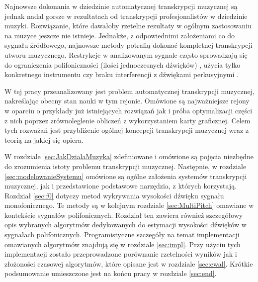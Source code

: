 \documentclass[12pt,a4paper,twoside]{mwart}
\begin{document}
Najnowsze dokonania w dziedzinie automatycznej transkrypcji muzycznej są jednak nadal gorsze w rezultatach od transkrypcji profesjonalistów w dziedzinie muzyki. Rozwiązanie, które dawałoby rzetelne rezultaty w ogólnym zastosowaniu na muzyce jeszcze nie istnieje. Jednakże, z odpowiednimi założeniami co do sygnału źródłowego, najnowsze metody potrafią dokonać kompletnej transkrypcji utworu muzycznego. Restrykcje w analizowanym sygnale często sprowadzają się do ograniczenia polifoniczności (ilości jednoczesnych dźwięków) \cite{Transcription:BayesianHarmonicModels}, użycia tylko konkretnego instrumentu \cite{Transcription:Hawthorne:OnsetsAndFrames} czy braku interferencji z dźwiękami perkusyjnymi \cite{Transcription:Kameoka:HarmonicSeparation}.

W tej pracy przeanalizowany jest problem automatycznej transkrypcji muzycznej, nakreślając obecny stan nauki w tym rejonie. Omówione są najważniejsze rejony w oparciu o przykłady już istniejących rozwiązań jak i próba optymalizacji części z nich poprzez zrównoleglenie obliczeń z wykorzystaniem karty graficznej. Celem tych rozważań jest przybliżenie ogólnej koncepcji transkrypcji muzycznej wraz z teorią na jakiej się opiera.

W rozdziale \ref{sec:JakDzialaMuzyka} zdefiniowane i omówione są pojęcia niezbędne do zrozumienia istoty problemu transkrypcji muzycznej. Następnie, w rozdziale \ref{sec:modelowanieSystemu} omówione są ogólne założenia systemów transkrypcji muzycznej, jak i przedstawione podstawowe narzędzia, z których korzystają. Rozdział \ref{sec:f0} dotyczy metod wykrywania wysokości dźwięku sygnału monofonicznego. Te metody są w kolejnym rozdziale \ref{sec:MultiPitch} omawiane w kontekście sygnałów polifonicznych. Rozdział ten zawiera również szczegółowy opis wybranych algorytmów dedykowanych do estymacji wysokości dźwięków w sygnałach polifonicznych. Programistyczne szczegóły na temat implementacji omawianych algorytmów znajdują się w rozdziale \ref{sec:impl}. Przy użyciu tych implementacji zostało przeprowadzone porównanie rzetelności wyników jak i złożoności czasowej algorytmów, które opisane jest w rozdziale \ref{sec:ewal}. Krótkie podsumowanie umieszczone jest na końcu pracy w rozdziale \ref{sec:end}. 

\newpage
\setcounter{secnumdepth}{4}
\end{document}
